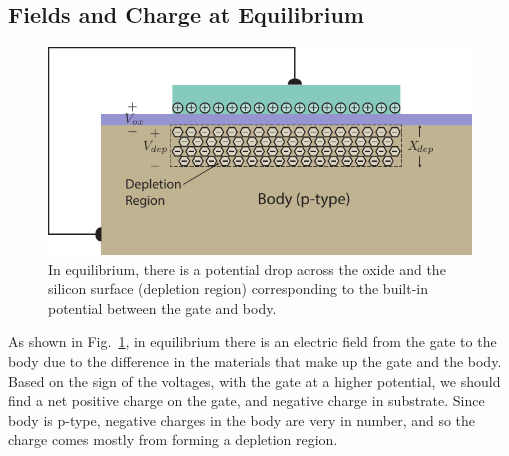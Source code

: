 \subsection{Fields and Charge at Equilibrium}
\begin{figure}[tbh]
\centering
\includegraphics[width=.75\columnwidth]{mos_cap_equilibrium}
\caption{In equilibrium, there is a potential drop across the oxide and the silicon surface (depletion region) corresponding to the built-in potential between the gate and body.}
\label{fig:mos_charge_equil}
\end{figure}
As shown in Fig.~\ref{fig:mos_charge_equil}, in equilibrium there is an electric field from the gate to the body due to the difference in the materials that make up the gate and the body.  Based on the sign of the voltages, with the gate at a higher potential, we should find a net positive charge on the gate, and negative charge in substrate.   Since body is p-type, negative charges in the body are very in number, and so the charge comes mostly from forming a depletion region.
